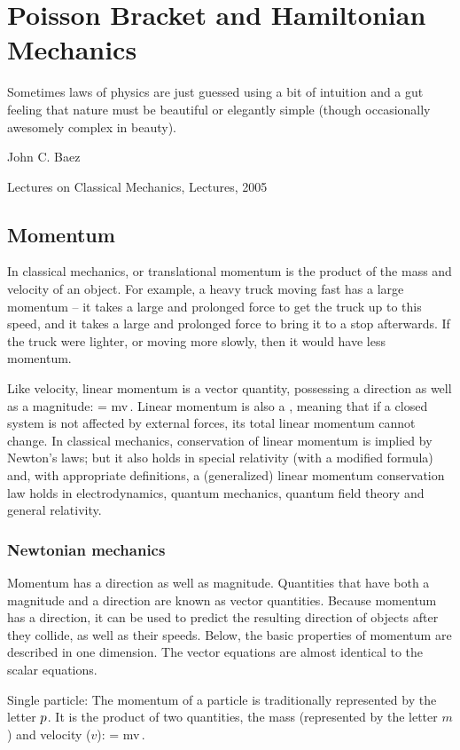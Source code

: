 \section{Poisson Bracket and Hamiltonian Mechanics}

\epigraph{Sometimes laws of physics are just guessed using a bit of intuition and a gut feeling that nature must be beautiful or elegantly simple (though occasionally awesomely complex in beauty).}
{John C. Baez}{Lectures on Classical Mechanics, Lectures, 2005}


\subsection{Momentum}
In classical mechanics,  or translational momentum is the product of the mass and velocity of an object. For example, a heavy truck moving fast has a large momentum -- it takes a large and prolonged force to get the truck up to this speed, and it takes a large and prolonged force to bring it to a stop afterwards. If the truck were lighter, or moving more slowly, then it would have less momentum.

Like velocity, linear momentum is a vector quantity, possessing a direction as well as a magnitude:
\beq
\lmom = mv\,.
\eeq
Linear momentum is also a , meaning that if a closed system is not affected by external forces, its total linear momentum cannot change. In classical mechanics, conservation of linear momentum is implied by Newton's laws; but it also holds in special relativity (with a modified formula) and, with appropriate definitions, a (generalized) linear momentum conservation law holds in electrodynamics, quantum mechanics, quantum field theory and general relativity.


\subsubsection{Newtonian mechanics}
Momentum has a direction as well as magnitude. Quantities that have both a magnitude and a direction are known as vector quantities. Because momentum has a direction, it can be used to predict the resulting direction of objects after they collide, as well as their speeds. Below, the basic properties of momentum are described in one dimension. The vector equations are almost identical to the scalar equations.

Single particle: The momentum of a particle is traditionally represented by the letter $p$. It is the product of two quantities, the mass (represented by the letter $m$) and velocity ($v$):
\beq
\lmom = mv\,.
\eeq

